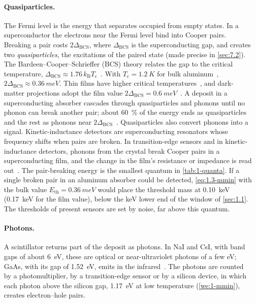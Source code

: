 \paragraph{Quasiparticles.} The Fermi level is the energy that separates occupied from empty states. In a superconductor the electrons near the Fermi level bind into Cooper pairs. Breaking a pair costs $2\Delta_{\mathrm{BCS}}$, where $\Delta_{\mathrm{BCS}}$ is the superconducting gap, and creates two \emph{quasiparticles}, the excitations of the paired state (made precise in \cref{sec:7.2}). The Bardeen--Cooper--Schrieffer (BCS) theory relates the gap to the critical temperature, $\Delta_{\mathrm{BCS}} \approx 1.76\,k_{\mathrm{B}}T_{\mathrm{c}}$~\cite[Sect.~3.3]{essig2022snowmass}. With $T_{\mathrm{c}} = \SI{1.2}{K}$ for bulk aluminum~\cite{yeh2023doubling}, $2\Delta_{\mathrm{BCS}} \approx \SI{0.36}{meV}$. Thin films have higher critical temperatures~\cite{yeh2023doubling}, and dark-matter projections adopt the film value $2\Delta_{\mathrm{BCS}} = \SI{0.6}{meV}$~\cites[Sect.~2.2.1]{hochberg2016detecting}[Table~II]{mitridate2021dark}. A deposit in a superconducting absorber cascades through quasiparticles and phonons until no phonon can break another pair; about \SI{60}{\percent} of the energy ends as quasiparticles and the rest as phonons near $2\Delta_{\mathrm{BCS}}$~\cite[Sect.~2.2.1]{hochberg2016detecting}. Quasiparticles also convert phonons into a signal. Kinetic-inductance detectors are superconducting resonators whose frequency shifts when pairs are broken. In transition-edge sensors and in kinetic-inductance detectors, phonons from the crystal break Cooper pairs in a superconducting film, and the change in the film's resistance or impedance is read out~\cite[Sect.~3.3.1]{essig2022snowmass}. The pair-breaking energy is the smallest quantum in \cref{tab:1-quanta}. If a single broken pair in an aluminum absorber could be detected, \cref{eq:1.3-mmin} with the bulk value $E_{\mathrm{th}} = \SI{0.36}{meV}$ would place the threshold mass at \SI{0.10}{keV} (\SI{0.17}{keV} for the film value), below the keV lower end of the window of \cref{sec:1.1}. The thresholds of present sensors are set by noise, far above this quantum.

\paragraph{Photons.} A scintillator returns part of the deposit as photons. In NaI and CsI, with band gaps of about \SI{6}{eV}, these are optical or near-ultraviolet photons of a few eV; GaAs, with its gap of \SI{1.52}{eV}, emits in the infrared~\cite[Sect.~VII\,C]{kahn2022searches}. The photons are counted by a photomultiplier, by a transition-edge sensor or by a silicon device, in which each photon above the silicon gap, \SI{1.17}{eV} at low temperature (\cref{we:1-mmin}), creates electron--hole pairs.

